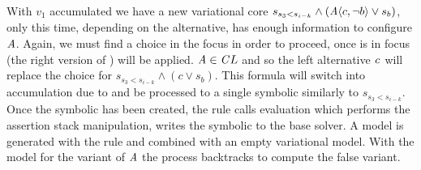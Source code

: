With $v_{1}$ accumulated we have a new variational core $s_{s_{3}<s_{i-k}} \wedge
(\chc[A]{c, \neg b} \vee s_{b})$, only this time, depending on the alternative,
\configuration{} has enough information to configure $\mathit{A}$. Again, we must
find a choice in the focus in order to proceed, once  is in
focus  (the right version of ) will be applied.
$\mathit{A} \in \mathit{C}{L}$ and so the left alternative $\mathit{c}$ will replace
the choice for $s_{s_{3}<s_{i-k}} \wedge (c \vee s_{b})$. This formula will
switch into accumulation due to  and be processed to a single
symbolic similarly to $s_{s_{3}<s_{i-k}}$. Once the symbolic has been created,
the  rule calls evaluation which performs the assertion stack
manipulation, writes the symbolic to the base solver. A model is generated with
the  rule and combined with an empty variational model. With the
model for the \true{} variant of $\mathit{A}$ the process backtracks to compute the
false variant.

